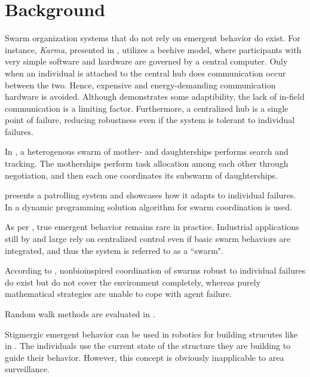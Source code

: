 \section{Background}
\par Swarm organization systems that do not rely on emergent behavior do exist. For instance, \textit{Karma}, presented in \parencite{dantu_programming_2011}, utilizes a beehive model, where participants with very simple software and hardware are governed by a central computer. Only when an individual is attached to the central hub does communication occur between the two. Hence, expensive and energy-demanding communication hardware is avoided. Although \parencite{dantu_programming_2011} demonstrates some adaptibility, the lack of in-field communication is a limiting factor. Furthermore, a centralized hub is a single point of failure, reducing robustness even if the system is tolerant to individual failures. 
\par In \parencite{elston_hierarchical_2008}, a heterogenous swarm of mother- and daughterships performs search and tracking. The motherships perform task allocation among each other through negotiation, and then each one coordinates its subswarm of daughterships.
\par \parencite{marino_fault-tolerant_2009} presents a patrolling system and showcases how it adapts to individual failures.
In \parencite{flint_cooperative_2002} a dynamic programming solution algorithm for swarm coordination is used.
\par As per \parencite{schranz_swarm_2020}, true emergent behavior remains rare in practice. Industrial applications still by and large rely on centralized control even if basic swarm behaviors are integrated, and thus the system is referred to as a ``swarm".
\par According to \parencite{calvo_bio-inspired_2011}, nonbioinspired coordination of swarms robust to individual failures do exist but do not cover the environment completely, whereas purely mathematical strategies are unable to cope with agent failure.
\par Random walk methods are evaluated in \parencite{pang_swarm_2019}.
\par Stigmergic emergent behavior can be used in robotics for building strucutes like in \parencite{werfel_designing_2014}. The individuals use the current state of the structure they are building to guide their behavior. However, this concept is obviously inapplicable to area surveillance.
